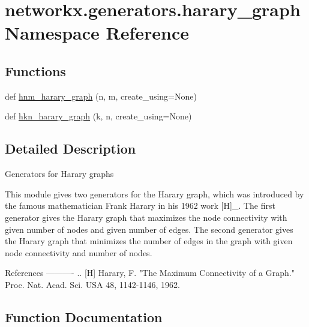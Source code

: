 \hypertarget{namespacenetworkx_1_1generators_1_1harary__graph}{}\section{networkx.\+generators.\+harary\+\_\+graph Namespace Reference}
\label{namespacenetworkx_1_1generators_1_1harary__graph}
\subsection*{Functions}
\begin{DoxyCompactItemize}
\item 
def \hyperlink{namespacenetworkx_1_1generators_1_1harary__graph_ae71edf076049d1048379a89df26c1f63}{hnm\+\_\+harary\+\_\+graph} (n, m, create\+\_\+using=None)
\item 
def \hyperlink{namespacenetworkx_1_1generators_1_1harary__graph_aa62f6bb6be72f8efb17441cd64846526}{hkn\+\_\+harary\+\_\+graph} (k, n, create\+\_\+using=None)
\end{DoxyCompactItemize}


\subsection{Detailed Description}
\begin{DoxyVerb}Generators for Harary graphs

This module gives two generators for the Harary graph, which was
introduced by the famous mathematician Frank Harary in his 1962 work [H]_.
The first generator gives the Harary graph that maximizes the node
connectivity with given number of nodes and given number of edges.
The second generator gives the Harary graph that minimizes
the number of edges in the graph with given node connectivity and
number of nodes.

References
----------
.. [H] Harary, F. "The Maximum Connectivity of a Graph."
   Proc. Nat. Acad. Sci. USA 48, 1142-1146, 1962.\end{DoxyVerb}
 

\subsection{Function Documentation}
\mbox{\label{namespacenetworkx_1_1generators_1_1harary__graph_aa62f6bb6be72f8efb17441cd64846526}} 

